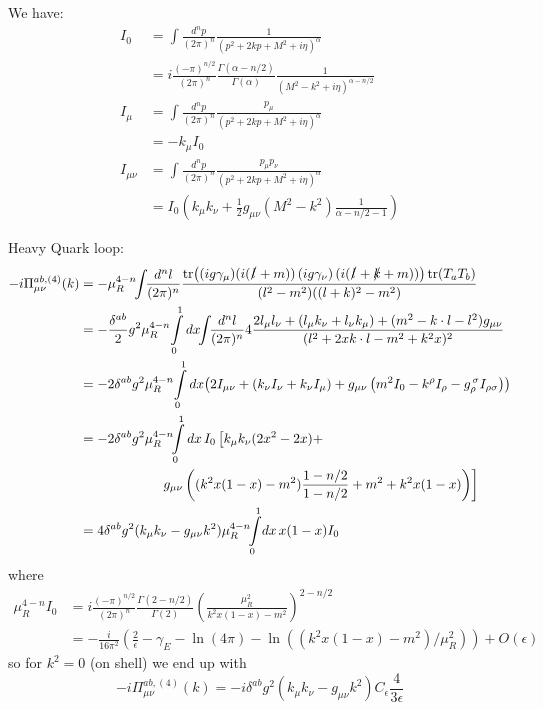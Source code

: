 We have\cite[(A.18)-(A.20)]{Pokorski}:
\begin{align}
I_0 &= \int\!\frac{d^np}{(2\pi)^n} \frac 1 {(p^2+2kp+M^2+i\eta)^\alpha}\\
 &= i\frac{(-\pi)^{n/2}}{(2\pi)^n} \frac{\Gamma(\alpha-n/2)}{\Gamma(\alpha)} \frac 1 {(M^2-k^2+i\eta)^{\alpha-n/2}}\\
I_\mu &= \int\!\frac{d^np}{(2\pi)^n} \frac {p_\mu} {(p^2+2kp+M^2+i\eta)^\alpha}\\
 &= - k_\mu I_0\\
I_{\mu\nu}&= \int\!\frac{d^np}{(2\pi)^n} \frac {p_\mu p_\nu} {(p^2+2kp+M^2+i\eta)^\alpha}\\
 &= I_0\left(k_\mu k_\nu + \frac 1 2 g_{\mu\nu}(M^2-k^2)\frac 1 {\alpha-n/2-1}\right)
\end{align}

Heavy Quark loop:
\begin{align}
-i\Pi_{\mu\nu}^{ab,(4)}(k) &=  -\mu_R^{4-n}\!\!\int\!\!\frac{d^nl}{(2\pi)^n} \frac{\tr\!\left((ig\gamma_\mu)(i(\slashed l + m))\left(ig\gamma_\nu\right)(i(\slashed l + \slashed k + m))\right)\tr(T_aT_b)}{(l^2-m^2)((l+k)^2-m^2)}\\
 &= -\frac {\delta^{ab}}{2}g^2\mu_R^{4-n}\!\int\limits_0^1dx\!\!\int\!\!\frac{d^nl}{(2\pi)^n} 4\frac{2l_\mu l_\nu+(l_\mu k_\nu+l_\nu k_\mu)+(m^2-k\cdot l-l^2)g_{\mu\nu}}{(l^2+2xk\cdot l-m^2+k^2 x)^2}\\
 &= -2\delta^{ab}g^2\mu_R^{4-n}\!\int\limits_0^1dx\!\left(2I_{\mu\nu}+\left(k_\nu I_\nu + k_\nu I_\mu\right) + g_{\mu\nu}\left(m^2I_0-k^\rho I_\rho - g_\rho^{\,\sigma}I_{\rho\sigma}\right)\right)\\
 &= -2\delta^{ab}g^2\mu_R^{4-n}\!\!\int\limits_0^1dx\,I_0\left[k_\mu k_\nu(2x^2-2x)+\right.\nonumber\\
 &\hspace{60pt}\left.g_{\mu\nu}\left((k^2x(1-x)-m^2)\frac{1-n/2}{1-n/2}+m^2+k^2x(1-x)\right)\right]\\
 &= 4\delta^{ab}g^2(k_\mu k_\nu - g_{\mu\nu}k^2) \mu_R^{4-n}\!\!\int\limits_0^1\!dx\,x(1-x)I_0
\end{align}
where
\begin{align}
\mu_R^{4-n}I_0 &= i\frac{(-\pi)^{n/2}}{(2\pi)^n} \frac{\Gamma(2-n/2)}{\Gamma(2)} \left(\frac {\mu_R^2} {k^2x(1-x)-m^2}\right)^{2-n/2}\\
 &= -\frac i {16\pi^2}\left(\frac 2 \epsilon - \gamma_E-\ln(4\pi)-\ln((k^2x(1-x)-m^2)/\mu_R^2)\right) + O(\epsilon)
\end{align}
so for $k^2=0$ (on shell) we end up with
\begin{equation}
-i\Pi_{\mu\nu}^{ab,(4)}(k) = -i\delta^{ab}g^2(k_\mu k_\nu - g_{\mu\nu}k^2) C_\epsilon \frac 4 {3\epsilon}
\end{equation}

